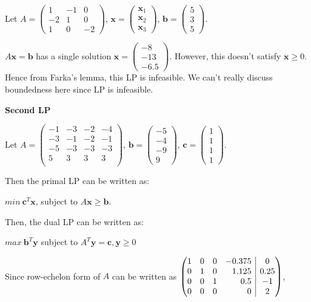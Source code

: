 \documentclass[11pt]{article}
\makeatletter
\newenvironment{redmatrix}
  {\left(\array{@{}rrrr|c@{}}}
  {\endarray\right)}
\newcommand{\bx}{\mathbf{x}}
\newcommand{\by}{\mathbf{y}}
\makeatother
\begin{document}
Let 
$A = 
\begin{pmatrix}
1 & -1 & 0 \\
-2 & 1 & 0 \\
1 & 0 & -2 
\end{pmatrix}$,
$\bx = 
\begin{pmatrix}
\bx_1 \\
\bx_2 \\
\bx_3
\end{pmatrix}$,
$\textbf{b} = 
\begin{pmatrix}
5 \\
3 \\
5
\end{pmatrix}$.

$A\bx = \textbf{b}$ has a single solution $\bx = \begin{pmatrix}
-8 \\
-13 \\
-6.5
\end{pmatrix}$.
However, this doesn't satisfy $\bx \geq 0$. Hence from Farka's lemma, this LP is infeasible. We can't really discuss boundedness here since LP is infeasible.

\textbf{Second LP}

Let 
$A = 
\begin{pmatrix}
-1 & -3 & -2 & -4 \\
-3 & -1 & -2 & -1 \\
-5 & -3 & -3 & -3 \\
5 & 3 & 3 & 3 \\ 
\end{pmatrix}$,
$\textbf{b} = 
\begin{pmatrix}
-5 \\
-4 \\
-9 \\
9
\end{pmatrix}$,
$\textbf{c} = 
\begin{pmatrix}
1 \\
1 \\
1 \\
1
\end{pmatrix}$.

Then the primal LP can be written as:

$min \ \textbf{c}^T \bx$, subject to $A\bx \geq \textbf{b}$.

Then, the dual LP can be written as:

$max \ \textbf{b}^T \by$ subject to $A^T \by = \textbf{c}, \by \geq 0$

Since row-echelon form of $A$ can be written as
$
\begin{redmatrix}
1&0&0&-0.375&0\\
0&1&0&1.125&0.25\\
0&0&1&0.5&-1\\
0&0&0&0&2
\end{redmatrix}
$,
\end{document}

